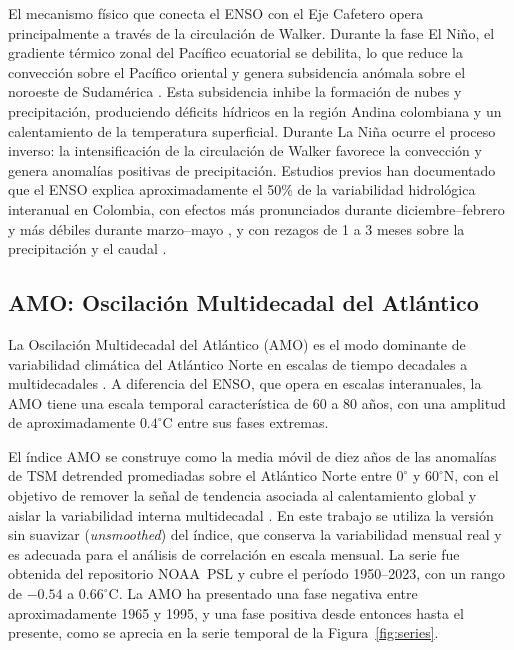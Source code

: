 \documentclass[12pt, a4paper]{article}
\begin{document}
El mecanismo físico que conecta el ENSO con el Eje Cafetero opera principalmente
a través de la circulación de Walker. Durante la fase El Niño, el gradiente
térmico zonal del Pacífico ecuatorial se debilita, lo que reduce la convección
sobre el Pacífico oriental y genera subsidencia anómala sobre el noroeste de
Sudamérica \citep{Poveda2001}. Esta subsidencia inhibe la formación de nubes y
precipitación, produciendo déficits hídricos en la región Andina colombiana y
un calentamiento de la temperatura superficial. Durante La Niña ocurre el proceso
inverso: la intensificación de la circulación de Walker favorece la convección
y genera anomalías positivas de precipitación. Estudios previos han documentado
que el ENSO explica aproximadamente el 50\% de la variabilidad hidrológica
interanual en Colombia, con efectos más pronunciados durante diciembre--febrero
y más débiles durante marzo--mayo \citep{Poveda2011}, y con rezagos de 1 a 3
meses sobre la precipitación y el caudal \citep{CórdobaMachado2015a}.

\subsection{AMO: Oscilación Multidecadal del Atlántico}

La Oscilación Multidecadal del Atlántico (AMO) es el modo dominante de
variabilidad climática del Atlántico Norte en escalas de tiempo decadales a
multidecadales \citep{Enfield2001}. A diferencia del ENSO, que opera en escalas
interanuales, la AMO tiene una escala temporal característica de 60 a 80 años,
con una amplitud de aproximadamente $0.4^\circ$C entre sus fases extremas.

El índice AMO se construye como la media móvil de diez años de las anomalías de
TSM detrended promediadas sobre el Atlántico Norte entre $0^\circ$ y $60^\circ$N,
con el objetivo de remover la señal de tendencia asociada al calentamiento global
y aislar la variabilidad interna multidecadal \citep{Enfield2001}. En este trabajo
se utiliza la versión sin suavizar (\textit{unsmoothed}) del índice, que conserva
la variabilidad mensual real y es adecuada para el análisis de correlación en
escala mensual. La serie fue obtenida del repositorio NOAA~PSL y cubre el período
1950--2023, con un rango de $-0.54$ a $0.66^\circ$C. La AMO ha presentado una
fase negativa entre aproximadamente 1965 y 1995, y una fase positiva desde
entonces hasta el presente, como se aprecia en la serie temporal de la
Figura~\ref{fig:series}.
\end{document}
